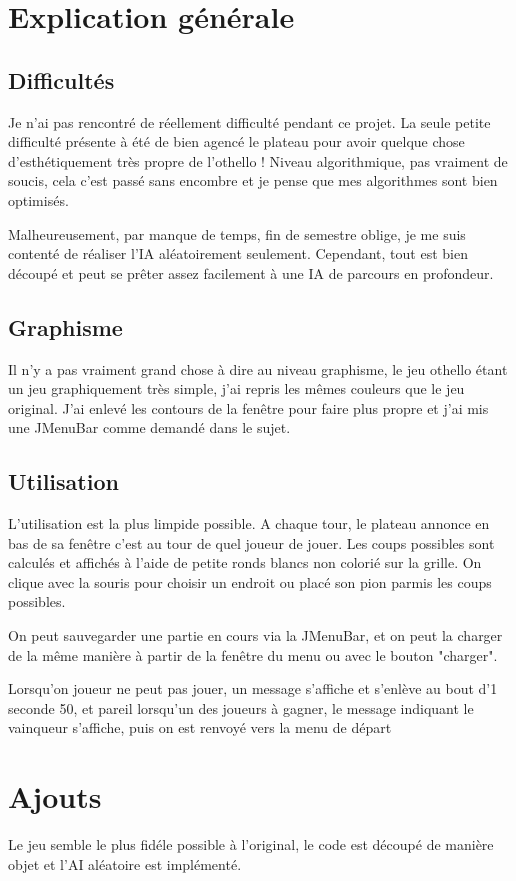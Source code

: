 \documentclass[a4paper]{article}
\date{20 mars 2017}
\begin{document}
\entete

\section{Explication générale}


\subsection{Difficultés}

Je n'ai pas rencontré de réellement difficulté pendant ce projet. La seule petite difficulté présente à été de bien agencé le plateau pour avoir quelque chose d'esthétiquement très propre de l'othello ! Niveau algorithmique, pas vraiment de soucis, cela c'est passé sans encombre et je pense que mes algorithmes sont bien optimisés.

Malheureusement, par manque de temps, fin de semestre oblige, je me suis contenté de réaliser l'IA aléatoirement seulement. Cependant, tout est bien découpé et peut se prêter assez facilement à une IA de parcours en profondeur.

\subsection{Graphisme}

Il n'y a pas vraiment grand chose à dire au niveau graphisme, le jeu othello étant un jeu graphiquement très simple, j'ai repris les mêmes couleurs que le jeu original. J'ai enlevé les contours de la fenêtre pour faire plus propre et j'ai mis une JMenuBar comme demandé dans le sujet.


\subsection{Utilisation}

L'utilisation est la plus limpide possible. A chaque tour, le plateau annonce en bas de sa fenêtre c'est au tour de quel joueur de jouer. Les coups possibles sont calculés et affichés à l'aide de petite ronds blancs non colorié sur la grille. On clique avec la souris pour choisir un endroit ou placé son pion parmis les coups possibles.

On peut sauvegarder une partie en cours via la JMenuBar, et on peut la charger de la même manière à partir de la fenêtre du menu ou avec le bouton "charger".

Lorsqu'on joueur ne peut pas jouer, un message s'affiche et s'enlève au bout d'1 seconde 50, et pareil lorsqu'un des joueurs à gagner, le message indiquant le vainqueur s'affiche, puis on est renvoyé vers la menu de départ

\section{Ajouts}

Le jeu semble le plus fidéle possible à l'original, le code est découpé de manière objet et l'AI aléatoire est implémenté.
\end{document}
